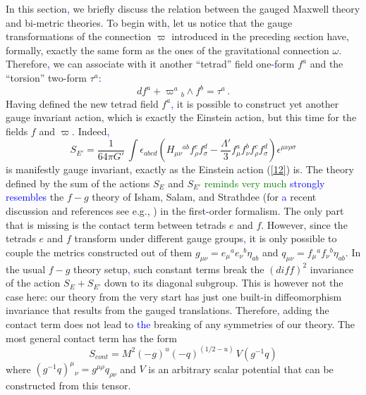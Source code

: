 \documentclass[prd,reprint,eqsecnum,nofootinbib]{revtex4-1}
\begin{document}
In this section\textcolor{blue}{,} we briefly discuss the relation between the gauged
Maxwell theory and bi-metric theories. To begin with\textcolor{blue}{,} let us notice
that the gauge transformations of the connection $\varpi$ introduced
in the preceding section have, formally, exactly the same form as
the ones of the gravitational connection $\omega$. Therefore\textcolor{blue}{,} we can
associate with it another ``tetrad'' field one\textcolor{blue}{-}form $f^a$ and the
``torsion'' two-form $\tau^a$\textcolor{blue}{:}
\begin{equation}\label{17}
    df^a + \varpi^a{}_b\wedge f^b=\tau^a\,.
\end{equation}
Having defined the new tetrad field $f^a$\textcolor{blue}{,} it is possible to
construct yet another gauge invariant action, which is exactly the
Einstein action, but this time for the fields $f$ and $\varpi$.
Indeed\textcolor{blue}{,}
\begin{equation}
S_{E'} =\frac1{64\pi G'}\,
\int\epsilon_{abcd}\left(H_{\mu\nu}{}^{ab}f_{\rho}^{c}f_{\sigma}^{d}
-\frac{\Lambda'}{3}f_{\mu}^{a}f_{\nu}^{b}f_{\rho}^{ c}f_{\sigma}^{
d}\right)\epsilon^{\mu\nu\rho\sigma}\label{18}
\end{equation}
is manifestly gauge invariant, exactly as the Einstein action
(\ref{12}) is. The theory defined by the sum of the actions $S_E$
and $S_{E'}$ \textcolor{green}{reminds very much} \textcolor{blue}{strongly resembles} the $f-g$ theory of Isham, Salam, and
Strathdee \cite{Isham:1971gm} (for \textcolor{blue}{a} recent discussion and references
see e.g., \cite{Banados:2008fi}) in the first\textcolor{blue}{-}order formalism. The
only part that is missing is the contact term between tetrads $e$
and $f$. However, since the tetrads $e$ and $f$ transform under
different gauge groups\textcolor{blue}{,} it is only possible to couple the metrics
constructed out of them $g_{\mu\nu} = e_\mu{}^ae_\nu{}^b\eta_{ab}$
and $q_{\mu\nu} = f_\mu{}^af_\nu{}^b\eta_{ab}$. In the usual $f-g$
theory setup\textcolor{blue}{,} such constant terms break the $(diff)^2$ invariance of
the action $S_E+S_{E'}$ down to its diagonal subgroup. This is
however not the case here: our theory from the very start has just
one built-in diffeomorphism invariance that results from the gauged
translations. Therefore\textcolor{blue}{,} adding the contact term does not lead to
\textcolor{blue}{the} breaking of any symmetries of our theory. The most general contact
term has the form
\begin{equation}\label{19}
    S_{cont} =
   {M^2}(-g)^u(-q)^{(1/2-u)}\, V(g^{-1}q)
\end{equation}
where $(g^{-1}q)^\mu{}_\nu = g^{\mu\rho}q_{\rho\nu}$ and $V$ is an
arbitrary scalar potential that can be constructed from this tensor.
\end{document}
